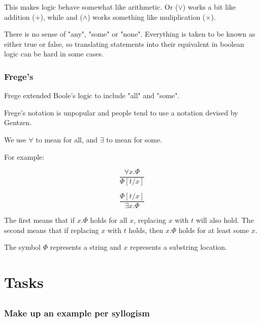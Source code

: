 \documentclass{article}
\begin{document}
This makes logic behave somewhat like arithmetic.
Or ($\vee$) works a bit like addition ($+$),
while and ($\wedge$) works something like muliplication ($\times$).

There is no sense of "any", "some" or "none". Everything is taken
to be known as either true or false, so translating statements into
their equivalent in boolean logic can be hard in some cases.

\subsubsection{Frege's}

Frege extended Boole's logic to include "all" and "some".

Frege's notation is unpopular and people tend to use a notation
devised by Gentzen.

We use $\forall$ to mean for all, and $\exists$ to mean for some.

For example:

\begin{center}
	\begin{minipage}{0.3\linewidth}
	\begin{displaymath}
		\frac{\forall x . \Phi}{\Phi [t/x]}
	\end{displaymath}
	\end{minipage}
	\begin{minipage}{0.3\linewidth}
	\begin{displaymath}
		\frac{\Phi [t/x]}{\exists x . \Phi}
	\end{displaymath}
	\end{minipage}
\end{center}

The first means that if $x.\Phi$ holds for all $x$,
replacing $x$ with $t$ will also hold.
The second means that if replacing $x$ with $t$ holds, then $x.\Phi$
holds for at least some $x$.

The symbol $\Phi$ represents a string and $x$ represents a substring location.

\section{Tasks}

\subsection{}

\subsubsection{Make up an example per syllogism}
\end{document}
